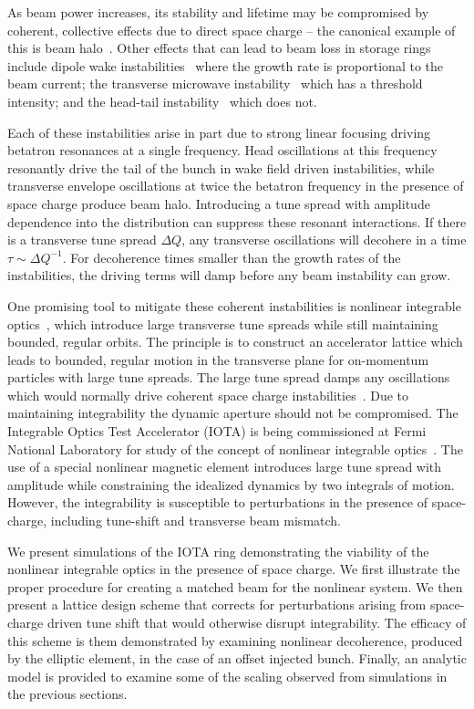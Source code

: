 \documentclass[aps,prstab,twocolumn, groupedaddress]{revtex4-1}
\begin{document}
As beam power increases, its stability and lifetime may be compromised by coherent, 
collective effects due to direct space charge -- the canonical example of this is beam 
halo~\cite{oconnell_etal:93, gluckstern:94, jameson:94, bruhwiler:95}. Other effects that 
can lead to beam loss in storage rings include dipole wake 
instabilities~\cite{courant_sessler:66, ferlinghi_pellegrini_touschek:66} where the growth 
rate is proportional to the beam current; the transverse microwave 
instability~\cite{talman:82} which has a threshold intensity; and the head-tail 
instability~\cite{pellegrini:69} which does not.

Each of these instabilities arise in part due to strong linear focusing driving betatron 
resonances at a single frequency. Head oscillations at this frequency resonantly drive the 
tail of the bunch in wake field driven instabilities, while  transverse envelope oscillations at 
twice the betatron frequency in the presence of space charge produce beam halo. 
Introducing a tune spread with amplitude dependence into the distribution can suppress 
these resonant interactions. If there is a transverse tune spread $\Delta Q$, any 
transverse oscillations will decohere in a time $\tau \sim \Delta Q^{-1}$. For decoherence 
times smaller than the growth rates of the instabilities, the driving terms will damp before 
any beam instability can grow.

One promising tool to mitigate these coherent instabilities is nonlinear integrable 
optics~\cite{danilovNagaitsev:2010, nagValDan:2010}, which introduce large transverse 
tune spreads while still maintaining bounded, regular orbits. The principle is to construct 
an accelerator lattice which leads to bounded, regular motion in the transverse plane for 
on-momentum particles with large tune spreads. The large tune spread damps any 
oscillations which would normally drive coherent space charge instabilities~\cite{webb:12}. 
Due to maintaining integrability the dynamic aperture should not be compromised. The 
Integrable Optics Test Accelerator (IOTA) is being commissioned at Fermi National 
Laboratory for study of the concept of nonlinear integrable optics~\cite{IOTA_techreport}. 
The use of a special nonlinear magnetic element introduces large tune spread with 
amplitude while constraining the idealized dynamics by two integrals of motion. However, 
the integrability is susceptible to perturbations in the presence of space-charge, including 
tune-shift and transverse beam mismatch.

We present simulations of the IOTA ring demonstrating the viability of the nonlinear 
integrable optics in the presence of space charge. We first illustrate the proper procedure 
for creating a matched beam for the nonlinear system. We then present a lattice design 
scheme that corrects for perturbations arising from space-charge driven tune shift that 
would otherwise disrupt integrability. The efficacy of this scheme is them demonstrated 
by examining nonlinear decoherence, produced by the elliptic element, in the case of an 
offset injected bunch. Finally, an analytic model is provided to examine some of the 
scaling observed from simulations in the previous sections.
\end{document}
